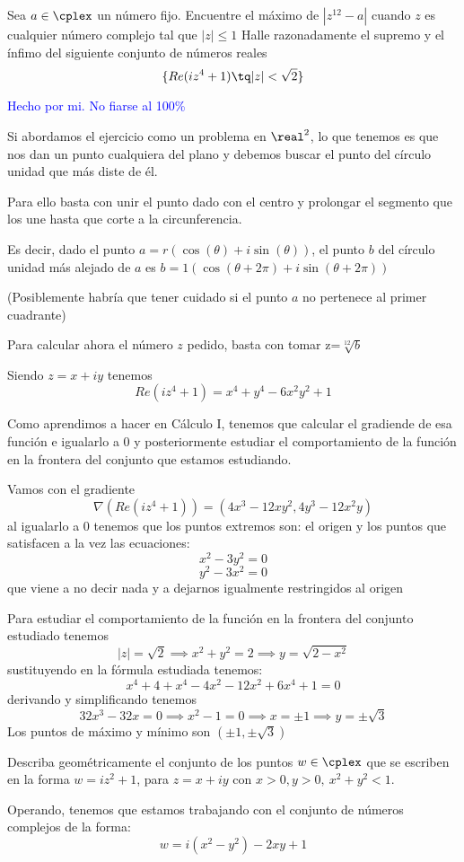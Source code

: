 \begin{problem}[19]
\ppart Sea $a \in \cplex$ un número fijo. Encuentre el máximo de $|z^{12}-a|$ cuando $z$ es cualquier número complejo tal que $|z|\leq 1$
\ppart Halle razonadamente el supremo y el ínfimo del siguiente conjunto de números reales
\[\{Re(iz^4+1) \tq |z|<\sqrt{2}\}\]

\solution
\textcolor{blue}{Hecho por mi. No fiarse al 100\%}

\spart
Si abordamos el ejercicio como un problema en $\real^2$, lo que tenemos es que nos dan un punto cualquiera del plano y debemos buscar el punto del círculo unidad que más diste de él.

Para ello basta con unir el punto dado con el centro y prolongar el segmento que los une hasta que corte a la circunferencia.

Es decir, dado el punto $a=r\left(\cos(\theta)+i\sin(\theta)\right)$, el punto $b$ del círculo unidad más alejado de $a$ es $b=1\left(\cos(\theta +2π)+i\sin(\theta +2π)\right)$

(Posiblemente habría que tener cuidado si el punto $a$ no pertenece al primer cuadrante)

Para calcular ahora el número $z$ pedido, basta con tomar z=$\sqrt[12]{b}$

\spart
Siendo $z=x+iy$ tenemos
\[Re(iz^4+1)=x^4+y^4-6x^2y^2+1\]

Como aprendimos a hacer en Cálculo I, tenemos que calcular el gradiende de esa función e igualarlo a 0 y posteriormente estudiar el comportamiento de la función en la frontera del conjunto que estamos estudiando.

Vamos con el gradiente
\[\nabla \left(Re(iz^4+1)\right) = \left(4x^3-12xy^2, 4y^3-12x^2y\right)\]
al igualarlo a 0 tenemos que los puntos extremos son: el origen y los puntos que satisfacen a la vez las ecuaciones:
\[x^2-3y^2=0\]
\[y^2-3x^2=0\]
que viene a no decir nada y a dejarnos igualmente restringidos al origen

Para estudiar el comportamiento de la función en la frontera del conjunto estudiado tenemos
\[|z| = \sqrt{2} \implies x^2+y^2 =2 \implies y=\sqrt{2-x^2} \]
sustituyendo en la fórmula estudiada tenemos:
\[x^4+4+x^4-4x^2-12x^2+6x^4 +1 =0\]
derivando y simplificando tenemos
\[32x^3-32x=0 \implies x^2-1=0 \implies x=\pm 1 \implies y = \pm \sqrt{3}\]
Los puntos de máximo y mínimo son $(\pm 1, \pm \sqrt{3})$

\end{problem}

\begin{problem}[20]
Describa geométricamente el conjunto de los puntos $w \in \cplex$ que se escriben en la forma $w=iz^2+1$, para $z=x+iy$ con $x>0, y>0, \ x^2+y^2<1$.

\solution

Operando, tenemos que estamos trabajando con el conjunto de números complejos de la forma:
\[w=i(x^2-y^2)-2xy+1\]


\end{problem}

